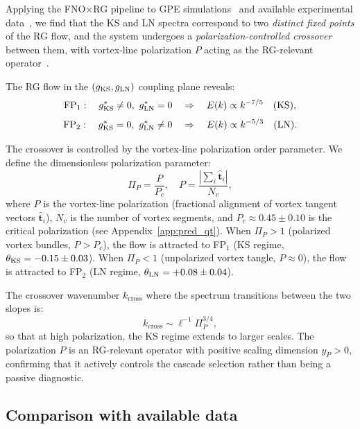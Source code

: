 Applying the FNO$\times$RG pipeline to GPE simulations~\cite{brachet2021gpe} and available experimental data~\cite{minowa2011transition}, we find that the KS and LN spectra correspond to two \emph{distinct fixed points} of the RG flow, and the system undergoes a \emph{polarization-controlled crossover} between them, with vortex-line polarization $P$ acting as the RG-relevant operator~\cite{kozik2004spectrum,lvov2010spectrum}.

The RG flow in the $(g_{\text{KS}}, g_{\text{LN}})$ coupling plane reveals:
{\small
\begin{equation} \label{eq:quantum_fixedpoints}
\text{FP}_1: \quad g_{\text{KS}}^* \neq 0,\ g_{\text{LN}}^* = 0 \quad \Rightarrow \quad E(k)\propto k^{-7/5} \quad (\text{KS}),
\end{equation}
}
{\small
\begin{equation} \label{eq:quantum_fixedpoints2}
\text{FP}_2: \quad g_{\text{KS}}^* = 0,\ g_{\text{LN}}^* \neq 0 \quad \Rightarrow \quad E(k)\propto k^{-5/3} \quad (\text{LN}).
\end{equation}
}

The crossover is controlled by the vortex-line polarization order parameter. We define the dimensionless polarization parameter:
\begin{equation}\label{eq:polarization_param}
\Pi_P = \frac{P}{P_c}, \quad P = \frac{|\sum_i \hat{\mathbf{t}}_i|}{N_v},
\end{equation}
where $P$ is the vortex-line polarization (fractional alignment of vortex tangent vectors $\hat{\mathbf{t}}_i$), $N_v$ is the number of vortex segments, and $P_c \approx 0.45 \pm 0.10$ is the critical polarization (see Appendix~\ref{app:pred_qt}). When $\Pi_P > 1$ (polarized vortex bundles, $P > P_c$), the flow is attracted to FP$_1$ (KS regime, $\theta_{\text{KS}} = -0.15 \pm 0.03$). When $\Pi_P < 1$ (unpolarized vortex tangle, $P \approx 0$), the flow is attracted to FP$_2$ (LN regime, $\theta_{\text{LN}} = +0.08 \pm 0.04$).

The crossover wavenumber $k_{\mathrm{cross}}$ where the spectrum transitions between the two slopes is:
\begin{equation}\label{eq:kcross}
k_{\mathrm{cross}} \sim \ell^{-1}\Pi_P^{3/4},
\end{equation}
so that at high polarization, the KS regime extends to larger scales. The polarization $P$ is an RG-relevant operator with positive scaling dimension $y_P > 0$, confirming that it actively controls the cascade selection rather than being a passive diagnostic.

\subsection{Comparison with available data}

